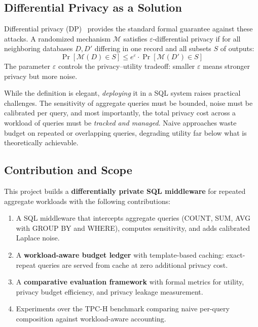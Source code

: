 \documentclass[sigconf,nonacm]{acmart}
\begin{document}
\subsection{Differential Privacy as a Solution}

Differential privacy (DP)~\cite{dwork2006calibrating} provides the standard formal guarantee against these attacks. A randomized mechanism $\mathcal{M}$ satisfies $\varepsilon$-differential privacy if for all neighboring databases $D, D'$ differing in one record and all subsets $S$ of outputs:
\begin{equation}
\Pr[\mathcal{M}(D) \in S] \leq e^{\varepsilon} \cdot \Pr[\mathcal{M}(D') \in S]
\label{eq:dp}
\end{equation}
The parameter $\varepsilon$ controls the privacy--utility tradeoff: smaller $\varepsilon$ means stronger privacy but more noise.

While the definition is elegant, \emph{deploying} it in a SQL system raises practical challenges. The sensitivity of aggregate queries must be bounded, noise must be calibrated per query, and most importantly, the total privacy cost across a workload of queries must be \emph{tracked and managed}. Naive approaches waste budget on repeated or overlapping queries, degrading utility far below what is theoretically achievable.

\subsection{Contribution and Scope}

This project builds a \textbf{differentially private SQL middleware} for repeated aggregate workloads with the following contributions:
\begin{enumerate}
    \item A SQL middleware that intercepts aggregate queries (COUNT, SUM, AVG with GROUP BY and WHERE), computes sensitivity, and adds calibrated Laplace noise.
    \item A \textbf{workload-aware budget ledger} with template-based caching: exact-repeat queries are served from cache at zero additional privacy cost.
    \item A \textbf{comparative evaluation framework} with formal metrics for utility, privacy budget efficiency, and privacy leakage measurement.
    \item Experiments over the TPC-H benchmark comparing naive per-query composition against workload-aware accounting.
\end{enumerate}
\end{document}
